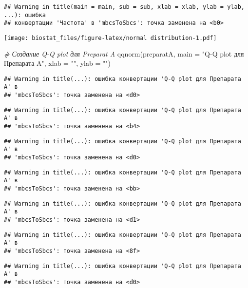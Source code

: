 \documentclass[
]{article}
\newenvironment{Shaded}{\begin{snugshade}}{\end{snugshade}}
\newcommand{\AttributeTok}[1]{\textcolor[rgb]{0.77,0.63,0.00}{#1}}
\newcommand{\CommentTok}[1]{\textcolor[rgb]{0.56,0.35,0.01}{\textit{#1}}}
\newcommand{\FunctionTok}[1]{\textcolor[rgb]{0.00,0.00,0.00}{#1}}
\newcommand{\NormalTok}[1]{#1}
\newcommand{\StringTok}[1]{\textcolor[rgb]{0.31,0.60,0.02}{#1}}
\begin{document}
\begin{verbatim}
## Warning in title(main = main, sub = sub, xlab = xlab, ylab = ylab, ...): ошибка
## конвертации 'Частота' в 'mbcsToSbcs': точка заменена на <b0>
\end{verbatim}

\texttt{[image: biostat\_files/figure-latex/normal distribution-1.pdf]}

\begin{Shaded}
\begin{Highlighting}[]
\CommentTok{\# Создание Q{-}Q plot для Preparat A}
\FunctionTok{qqnorm}\NormalTok{(preparatA, }\AttributeTok{main =} \StringTok{"Q{-}Q plot для Препарата A"}\NormalTok{, }\AttributeTok{xlab =} \StringTok{""}\NormalTok{, }\AttributeTok{ylab =} \StringTok{""}\NormalTok{)}
\end{Highlighting}
\end{Shaded}

\begin{verbatim}
## Warning in title(...): ошибка конвертации 'Q-Q plot для Препарата A' в
## 'mbcsToSbcs': точка заменена на <d0>
\end{verbatim}

\begin{verbatim}
## Warning in title(...): ошибка конвертации 'Q-Q plot для Препарата A' в
## 'mbcsToSbcs': точка заменена на <b4>
\end{verbatim}

\begin{verbatim}
## Warning in title(...): ошибка конвертации 'Q-Q plot для Препарата A' в
## 'mbcsToSbcs': точка заменена на <d0>
\end{verbatim}

\begin{verbatim}
## Warning in title(...): ошибка конвертации 'Q-Q plot для Препарата A' в
## 'mbcsToSbcs': точка заменена на <bb>
\end{verbatim}

\begin{verbatim}
## Warning in title(...): ошибка конвертации 'Q-Q plot для Препарата A' в
## 'mbcsToSbcs': точка заменена на <d1>
\end{verbatim}

\begin{verbatim}
## Warning in title(...): ошибка конвертации 'Q-Q plot для Препарата A' в
## 'mbcsToSbcs': точка заменена на <8f>
\end{verbatim}

\begin{verbatim}
## Warning in title(...): ошибка конвертации 'Q-Q plot для Препарата A' в
## 'mbcsToSbcs': точка заменена на <d0>
\end{verbatim}
\end{document}
